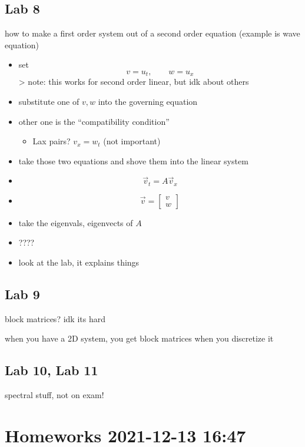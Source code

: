 \documentclass[
]{article}
\providecommand{\tightlist}{%
  \setlength{\itemsep}{0pt}\setlength{\parskip}{0pt}}
\begin{document}
\hypertarget{lab-8}{%
\subsection{Lab 8}\label{lab-8}}

how to make a first order system out of a second order equation (example
is wave equation)

\begin{itemize}
\item
  set \[v = u_t, \qquad w = u_x\] \textgreater{} note: this works for
  second order linear, but idk about others
\item
  substitute one of \(v,w\) into the governing equation
\item
  other one is the ``compatibility condition''

  \begin{itemize}
  \tightlist
  \item
    Lax pairs? \(v_x = w_t\) (not important)
  \end{itemize}
\item
  take those two equations and shove them into the linear system
\item
  \[\vec{v}_t = A \vec{v}_x\]
\item
  \[ \vec{v} = \begin{bmatrix} v \\ w \end{bmatrix} \]
\item
  take the eigenvals, eigenvects of \(A\)
\item
  ????
\item
  look at the lab, it explains things
\end{itemize}

\hypertarget{lab-9}{%
\subsection{Lab 9}\label{lab-9}}

block matrices? idk its hard

when you have a 2D system, you get block matrices when you discretize it

\hypertarget{lab-10-lab-11}{%
\subsection{Lab 10, Lab 11}\label{lab-10-lab-11}}

spectral stuff, not on exam!

\hypertarget{homeworks-2021-12-13-1647}{%
\section{Homeworks 2021-12-13 16:47}\label{homeworks-2021-12-13-1647}}
\end{document}

